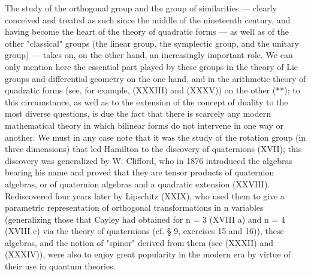 The study of the orthogonal group and the group of similarities --- clearly conceived and treated as such since the middle of the nineteenth century, and having become the heart of the theory of quadratic forms — as well as of the other "classical" groups (the linear group, the symplectic group, and the unitary group) — takes on, on the other hand, an increasingly important role. We can only mention here the essential part played by these groups in the theory of Lie groups and differential geometry on the one hand, and in the arithmetic theory of quadratic forms (see, for example, (XXXIII) and (XXXV)) on the other (**); to this circumstance, as well as to the extension of the concept of duality to the most diverse questions, is due the fact that there is scarcely any modern mathematical theory in which bilinear forms do not intervene in one way or another. We must in any case note that it was the study of the rotation group (in three dimensions) that led Hamilton to the discovery of quaternions (XVII); this discovery was generalized by W. Clifford, who in 1876 introduced the algebras bearing his name and proved that they are tensor products of quaternion algebras, or of quaternion algebras and a quadratic extension (XXVIII). Rediscovered four years later by Lipschitz (XXIX), who used them to give a parametric representation of orthogonal transformations in n variables (generalizing those that Cayley had obtained for n = 3 (XVIII a) and n = 4 (XVIII c) via the theory of quaternions (cf. § 9, exercises 15 and 16)), these algebras, and the notion of "spinor" derived from them (see (XXXII) and (XXXIV)), were also to enjoy great popularity in the modern era by virtue of their use in quantum theories.

